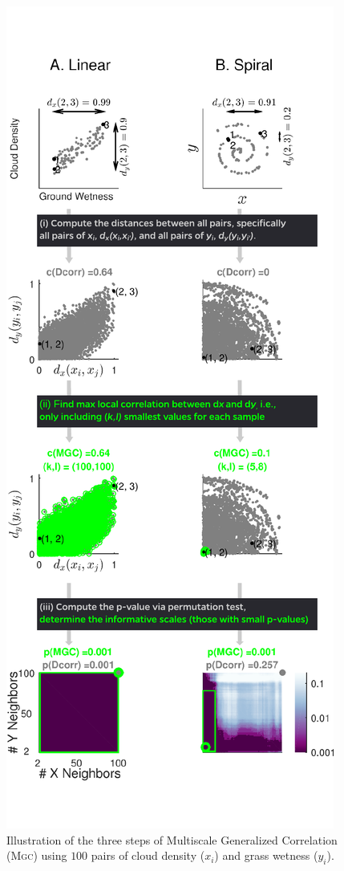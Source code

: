\documentclass[11pt]{article}
\providecommand{\sct}[1]{{\normalfont\textsc{#1}}}
\newcommand{\Mgc}{\sct{Mgc}}
\begin{document}
\begin{figure}
\includegraphics[height=1.0\textheight,trim={0cm 1.8cm 0 2cm},clip]{Figures/Fig1Allb.pdf}
\caption{Illustration of the three steps of Multiscale Generalized Correlation (\Mgc)  using  $100$ pairs of cloud density ($x_i$) and grass wetness ($y_i$). 
}
\end{figure}
\end{document}
